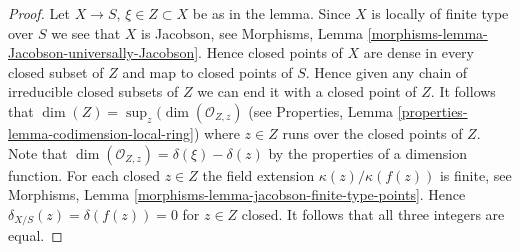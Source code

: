 \documentclass[10pt,a4paper]{amsart}
\theoremstyle{plain}
\theoremstyle{definition}
\theoremstyle{remark}
\numberwithin{equation}{subsection}
\begin{document}
\begin{proof}
Let $X \to S$, $\xi \in Z \subset X$ be as in the lemma.
Since $X$ is locally of finite type over $S$ we see that
$X$ is Jacobson, see
Morphisms, Lemma \ref{morphisms-lemma-Jacobson-universally-Jacobson}.
Hence closed points of $X$ are dense in every closed subset of $Z$
and map to closed points of $S$. Hence given any chain
of irreducible closed subsets of $Z$ we can end it with a closed point of $Z$.
It follows that $\dim(Z) = \sup_z(\dim(\mathcal{O}_{Z, z})$
(see Properties, Lemma \ref{properties-lemma-codimension-local-ring})
where $z \in Z$ runs over the closed points of $Z$.
Note that $\dim(\mathcal{O}_{Z, z}) = \delta(\xi) - \delta(z)$
by the properties of a dimension function.
For each closed $z \in Z$ the field extension
$\kappa(z)/\kappa(f(z))$ is finite, see Morphisms,
Lemma \ref{morphisms-lemma-jacobson-finite-type-points}.
Hence $\delta_{X/S}(z) = \delta(f(z)) = 0$ for $z \in Z$ closed.
It follows that all three integers are equal.
\end{proof}
\end{document}
